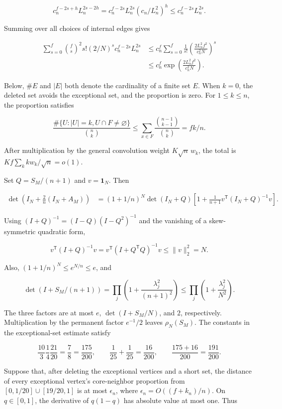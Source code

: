 \documentclass[11pt,a4paper]{article}
\begin{document}
\[
c_n^{f-2s+h}L_n^{2s-2h}
=c_n^{f-2s}L_n^{2s}(c_n/L_n^2)^h
\le c_n^{f-2s}L_n^{2s}.
\]

Summing over all choices of internal edges gives

\[
\begin{aligned}
\sum_{s=0}^f\binom fs^2s!(2/N)^sc_n^{f-2s}L_n^{2s}
&\le c_n^f\sum_{s=0}^f\frac1{s!}
\left(\frac{2L_n^2f^2}{c_n^2N}\right)^s\\
&\le c_n^f\exp\left(\frac{2L_n^2f^2}{c_n^2N}\right).
\end{aligned}
\]

Below, \(\#E\) and \(|E|\) both denote the cardinality of a finite set \(E\). When \(k=0\), the deleted set avoids the exceptional set, and the proportion is zero. For \(1\le k\le n\), the proportion satisfies

\[
\frac{\#\{U:|U|=k,U\cap F\ne\varnothing\}}{\binom nk}
\le\sum_{x\in F}\frac{\binom{n-1}{k-1}}{\binom nk}=fk/n.
\]

After multiplication by the general convolution weight \(K\sqrt n\,w_k\), the total is \(Kf\sum_kkw_k/\sqrt n=o(1)\).

Set \(Q=S_M/(n+1)\) and \(v=\mathbf1_N\). Then

\[
\begin{aligned}
\det\left(I_N+\frac2n(I_N+A_M)\right)
&=(1+1/n)^N\det(I_N+Q)
\left[1+\frac1{n+1}v^{\mathsf T}(I_N+Q)^{-1}v\right].
\end{aligned}
\]

Using \((I+Q)^{-1}=(I-Q)(I-Q^2)^{-1}\) and the vanishing of a skew-symmetric quadratic form,

\[
v^{\mathsf T}(I+Q)^{-1}v=v^{\mathsf T}(I+Q^{\mathsf T}Q)^{-1}v\le\|v\|_2^2=N.
\]

Also, \((1+1/n)^N\le e^{N/n}\le e\), and

\[
\det(I+S_M/(n+1))=\prod_j\left(1+\frac{\lambda_j^2}{(n+1)^2}\right)
\le\prod_j\left(1+\frac{\lambda_j^2}{N^2}\right).
\]

The three factors are at most \(e\), \(\det(I+S_M/N)\), and \(2\), respectively. Multiplication by the permanent factor \(e^{-1}/2\) leaves \(\rho_N(S_M)\). The constants in the exceptional-set estimate satisfy

\[
\frac{10}{3}\frac14\frac{21}{20}=\frac78=\frac{175}{200},\qquad
\frac1{25}+\frac1{25}=\frac{16}{200},\qquad
\frac{175+16}{200}=\frac{191}{200}.
\]

Suppose that, after deleting the exceptional vertices and a short set, the distance of every exceptional vertex's core-neighbor proportion from \([0,1/20]\cup[19/20,1]\) is at most \(\epsilon_n\), where \(\epsilon_n=O((f+k_n)/n)\). On \(q\in[0,1]\), the derivative of \(q(1-q)\) has absolute value at most one. Thus
\end{document}

